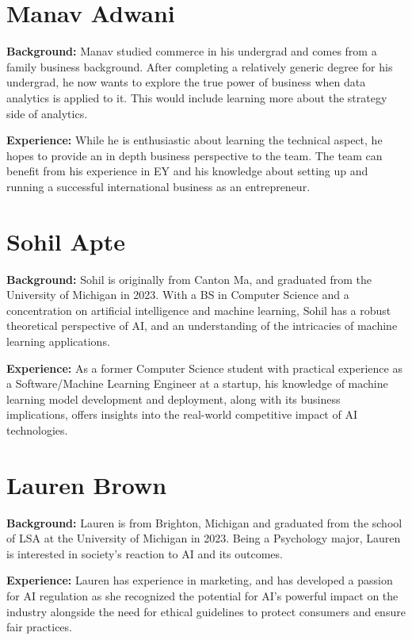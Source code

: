 \documentclass[
]{book}
\begin{document}
\hypertarget{manav-adwani}{%
\section{Manav Adwani}\label{manav-adwani}}

\textbf{Background:}
Manav studied commerce in his undergrad and comes from a family business background. After completing a relatively generic degree for his undergrad, he now wants to explore the true power of business when data analytics is applied to it. This would include learning more about the strategy side of analytics.

\textbf{Experience:}
While he is enthusiastic about learning the technical aspect, he hopes to provide an in depth business perspective to the team. The team can benefit from his experience in EY and his knowledge about setting up and running a successful international business as an entrepreneur.

\hypertarget{sohil-apte}{%
\section{Sohil Apte}\label{sohil-apte}}

\textbf{Background:}
Sohil is originally from Canton Ma, and graduated from the University of Michigan in 2023. With a BS in Computer Science and a concentration on artificial intelligence and machine learning, Sohil has a robust theoretical perspective of AI, and an understanding of the intricacies of machine learning applications.

\textbf{Experience:}
As a former Computer Science student with practical experience as a Software/Machine Learning Engineer at a startup, his knowledge of machine learning model development and deployment, along with its business implications, offers insights into the real-world competitive impact of AI technologies.

\hypertarget{lauren-brown}{%
\section{Lauren Brown}\label{lauren-brown}}

\textbf{Background:}
Lauren is from Brighton, Michigan and graduated from the school of LSA at the University of Michigan in 2023. Being a Psychology major, Lauren is interested in society's reaction to AI and its outcomes.

\textbf{Experience:}
Lauren has experience in marketing, and has developed a passion for AI regulation as she recognized the potential for AI's powerful impact on the industry alongside the need for ethical guidelines to protect consumers and ensure fair practices.
\end{document}
